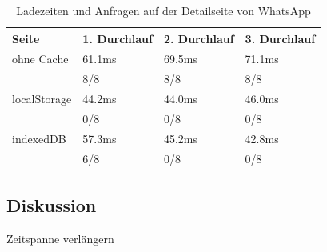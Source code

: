 \begin{table}[h]
	\begin{tabular}{p{2.8cm}C{3.0cm}C{2.8cm}C{3.0cm}}
		\toprule
		\textbf{Seite}	&	\textbf{1. Durchlauf}	&	\textbf{2. Durchlauf}	& \textbf{3. Durchlauf}\\
		\midrule
		ohne Cache	&	61.1ms	&	69.5ms	&	71.1ms	\\
		&	8/8	&	8/8	&	8/8	\\
		
		localStorage	&	44.2ms	&	44.0ms	&	46.0ms	\\
		&	0/8		&	0/8	&	0/8	\\
		
		indexedDB	&	57.3ms	&	45.2ms	&	42.8ms	\\
		&	6/8	&	0/8	&	0/8	\\
		
		\bottomrule
	\end{tabular}
	\caption{Ladezeiten und Anfragen auf der Detailseite von \glqq WhatsApp \grqq{}}
	\label{ergebnis3}
\end{table}

\subsection{Diskussion}
\label{ss:diskussionht2}

Zeitspanne verlängern
